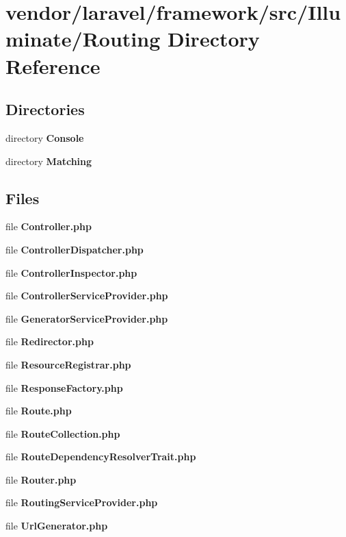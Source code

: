 \section{vendor/laravel/framework/src/\+Illuminate/\+Routing Directory Reference}
\label{dir_36c6d038dc27c2b7ef6e6c0d4ad790b7}
\subsection*{Directories}
\begin{DoxyCompactItemize}
\item 
directory {\bf Console}
\item 
directory {\bf Matching}
\end{DoxyCompactItemize}
\subsection*{Files}
\begin{DoxyCompactItemize}
\item 
file {\bf Controller.\+php}
\item 
file {\bf Controller\+Dispatcher.\+php}
\item 
file {\bf Controller\+Inspector.\+php}
\item 
file {\bf Controller\+Service\+Provider.\+php}
\item 
file {\bf Generator\+Service\+Provider.\+php}
\item 
file {\bf Redirector.\+php}
\item 
file {\bf Resource\+Registrar.\+php}
\item 
file {\bf Response\+Factory.\+php}
\item 
file {\bf Route.\+php}
\item 
file {\bf Route\+Collection.\+php}
\item 
file {\bf Route\+Dependency\+Resolver\+Trait.\+php}
\item 
file {\bf Router.\+php}
\item 
file {\bf Routing\+Service\+Provider.\+php}
\item 
file {\bf Url\+Generator.\+php}
\end{DoxyCompactItemize}
